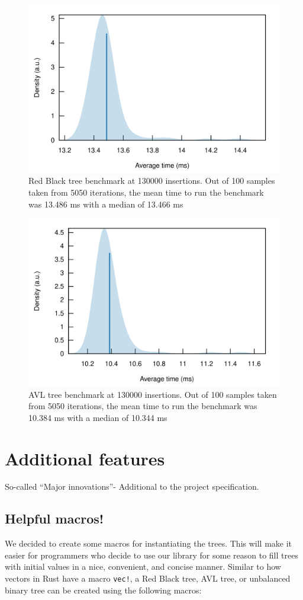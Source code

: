 \documentclass[letterpaper]{article}
\begin{document}
\begin{figure}[H]
	\centering
	\includegraphics[width=.8\textwidth]{rbbeeg.png}
	\caption{Red Black tree benchmark at 130000 insertions. Out of 100 samples
		taken from 5050 iterations, the mean time to run the benchmark was 13.486
		ms with a median of 13.466 ms}
\end{figure}


\begin{figure}[H]
	\centering
	\includegraphics[width=.8\textwidth]{avlbeeg.png}
	\caption{AVL tree benchmark at 130000 insertions. Out of 100 samples
		taken from 5050 iterations, the mean time to run the benchmark was 10.384
		ms with a median of 10.344 ms}
\end{figure}

\section{Additional features}
So-called ``Major innovations''- Additional to the project specification.

\subsection{Helpful macros!}
We decided to create some macros for instantiating the trees.  This will make it
easier for programmers who decide to use our library for some reason to fill
trees with initial values in a nice, convenient, and concise manner.
Similar to how vectors in Rust have a macro \texttt{vec!}, a Red Black tree,
AVL tree, or unbalanced binary tree can be created using the
following macros:
\end{document}
